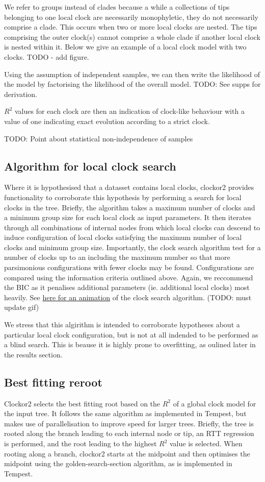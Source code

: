 \documentclass{article}
\begin{document}
We refer to groups instead of clades because a while a collections of tips belonging to one local clock are necessarily monophyletic, they do not necessarily comprise a clade. This occurs when two or more local clocks are nested. The tips comprising the outer clock(s) cannot comprise a whole clade if another local clock is nested within it. Below we give an example of a local clock model with two clocks. TODO - add figure.

Using the assumption of independent samples, we can then write the likelihood of the model by factorising the likelihood of the overall model. TODO: See supps for derivation.

$R^2$ values for each clock are then an indication of clock-like behaviour with a value of one indicating exact evolution according to a strict clock. 

TODO: Point about statistical non-independence of samples

\subsection*{Algorithm for local clock search}
Where it is hypothesised that a datasset contains local clocks, clockor2 provides functionality to corroborate this hypothesis by performing a search for local clocks in the tree. Briefly, the algorithm takes a maximum number of clocks and a minimum group size for each local clock as input parameters. It then iterates through all combinations of internal nodes from which local clocks can descend to induce  configuration of local clocks satisfying the maximum number of local clocks and minimum group size. Importantly, the clock search algorithm test for a number of clocks up to an including the maximum number so that more parsimonious configurations with fewer clocks may be found. Configurations are compared using the information criteria outlined above. Again, we reccommend the BIC as it penalises additional parameters (ie. additional local clocks) most heavily. See \href{https://github.com/LeoFeatherstone/clockor2Paper/blob/main/figures/clockSearchEg2Clocks.gif}{here for an animation} of the clock search algorithm. (TODO: must update gif) 

We stress that this algirithm is intended to corroborate hypotheses about a particular local clock configuration, but is not at all indended to be performed as a blind search. This is beause it is highly prone to overfitting, as oulined later in the results section.


\subsection*{Best fitting reroot}
Clockor2 selects the best fitting root based on the $R^2$ of a global clock model for the input tree. It follows the same algorithm as implemented in Tempest, but makes use of parallelisation to improve speed for larger trees. Briefly, the tree is rooted along the branch leading to each internal node or tip, an RTT regression is performed, and the root leading to the highest $R^2$ value is selected. When rooting along a branch, clockor2 starts at the midpoint and then optimises the midpoint using the golden-search-section algorithm, as is implemented in Tempest.
\end{document}
